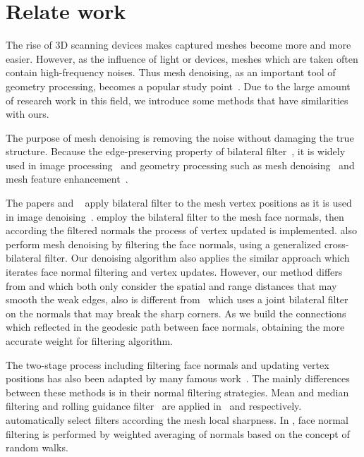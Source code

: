 \section{Relate work}

The rise of 3D scanning devices makes captured meshes become more and more easier.
However, as the influence of light or devices, meshes which are taken often contain high-frequency noises.
Thus mesh denoising, as an important tool of geometry processing, becomes a popular study point~\cite{Wang2008comprehensive}.
Due to the large amount of research work in this field, we introduce some methods that have similarities with ours.

The purpose of mesh denoising is removing the noise without damaging the true structure.
Because the edge-preserving property of bilateral filter~\cite{tomasi1998bilateral}, it is widely used in image processing~\cite{oh2001image, durand2002fast, Barash2004common, Wang2014decoupling} and geometry processing such as mesh denoising~\cite{fleishman2003bilateral, jones2003non, zheng2011bilateral, Solomon2014general} and mesh feature enhancement~\cite{Wang2006bilateral}.

The papers \cite{fleishman2003bilateral} and ~\cite{jones2003non} apply bilateral filter to the mesh vertex positions as it is used in image denoising~\cite{durand2002fast}.
\cite{zheng2011bilateral} employ the bilateral filter to the mesh face normals, then according the filtered normals the process of vertex updated is implemented.
\cite{Solomon2014general} also perform mesh denoising by filtering the face normals, using a generalized cross-bilateral filter.
Our denoising algorithm also applies the similar approach which iterates face normal filtering and vertex updates.
However, our method differs from \cite{zheng2011bilateral} and \cite{Solomon2014general} which both only consider the spatial and range distances that may smooth the weak edges,
also is different from~\cite{Zhang2015Filter} which uses a joint bilateral filter on the normals that may break the sharp corners.
As we build the connections which reflected in the geodesic path between face normals, obtaining the more accurate weight for filtering algorithm.

The two-stage process including filtering face normals and updating vertex positions has also been adapted by many famous work~\cite{yagou2002mesh, chen2005sharpness, sun2008random, Wang2015rolling}.
The mainly differences between these methods is in their normal filtering strategies.
Mean and median filtering and rolling guidance filter~\cite{Zhang2014rolling} are applied in~\cite{yagou2002mesh} and \cite{Wang2015rolling} respectively.
\cite{chen2005sharpness} automatically select filters according the mesh local sharpness.
In \cite{sun2008random}, face normal filtering is performed by weighted averaging of normals based on the concept of random walks.

